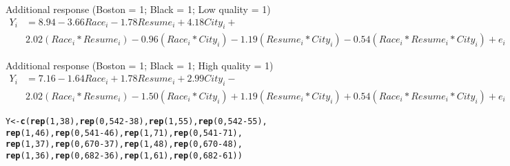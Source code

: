 \documentclass[11pt,notitlepage]{article}\usepackage[]{graphicx}\usepackage[]{color}
\makeatletter
\newcommand{\hlnum}[1]{\textcolor[rgb]{0.686,0.059,0.569}{#1}}%
\newcommand{\hlopt}[1]{\textcolor[rgb]{0,0,0}{#1}}%
\newcommand{\hlstd}[1]{\textcolor[rgb]{0.345,0.345,0.345}{#1}}%
\newcommand{\hlkwb}[1]{\textcolor[rgb]{0.69,0.353,0.396}{#1}}%
\newcommand{\hlkwd}[1]{\textcolor[rgb]{0.737,0.353,0.396}{\textbf{#1}}}%
\newenvironment{kframe}{%
 \def\at@end@of@kframe{}%
 \ifinner\ifhmode%
  \def\at@end@of@kframe{\end{minipage}}%
  \begin{minipage}{\columnwidth}%
 \fi\fi%
 \def\FrameCommand##1{\hskip\@totalleftmargin \hskip-\fboxsep
 \colorbox{shadecolor}{##1}\hskip-\fboxsep
     \hskip-\linewidth \hskip-\@totalleftmargin \hskip\columnwidth}%
 \MakeFramed {\advance\hsize-\width
   \@totalleftmargin\z@ \linewidth\hsize
   \@setminipage}}%
 {\par\unskip\endMakeFramed%
 \at@end@of@kframe}
\makeatother
\begin{document}
\begin{enumerate}[a)]
Additional response (Boston = 1; Black = 1; Low quality = 1)
\begin{align*}
Y_i &= 8.94 - 3.66 Race_i - 1.78 Resume_i + 4.18 City_i + \\
& 2.02 (Race_i * Resume_i) - 0.96  (Race_i * City_i) - 1.19  (Resume_i * City_i) -0.54 (Race_i * Resume_i * City_i) + e_i
\end{align*}

Additional response (Boston = 1; Black = 1; High quality = 1)
\begin{align*}
Y_i &= 7.16 - 1.64 Race_i + 1.78 Resume_i + 2.99 City_i - \\
& 2.02 (Race_i * Resume_i) - 1.50  (Race_i * City_i) + 1.19  (Resume_i * City_i) + 0.54 (Race_i * Resume_i * City_i) + e_i
\end{align*}

\begin{kframe}
\begin{alltt}
\hlstd{Y} \hlkwb{<-} \hlkwd{c}\hlstd{(}\hlkwd{rep}\hlstd{(}\hlnum{1}\hlstd{,} \hlnum{38}\hlstd{),} \hlkwd{rep}\hlstd{(}\hlnum{0}\hlstd{,} \hlnum{542}\hlopt{-}\hlnum{38}\hlstd{),} \hlkwd{rep}\hlstd{(}\hlnum{1}\hlstd{,} \hlnum{55}\hlstd{),} \hlkwd{rep}\hlstd{(}\hlnum{0}\hlstd{,} \hlnum{542}\hlopt{-}\hlnum{55}\hlstd{),}
       \hlkwd{rep}\hlstd{(}\hlnum{1}\hlstd{,} \hlnum{46}\hlstd{),} \hlkwd{rep}\hlstd{(}\hlnum{0}\hlstd{,} \hlnum{541}\hlopt{-}\hlnum{46}\hlstd{),} \hlkwd{rep}\hlstd{(}\hlnum{1}\hlstd{,} \hlnum{71}\hlstd{),} \hlkwd{rep}\hlstd{(}\hlnum{0}\hlstd{,} \hlnum{541}\hlopt{-}\hlnum{71}\hlstd{),}
       \hlkwd{rep}\hlstd{(}\hlnum{1}\hlstd{,} \hlnum{37}\hlstd{),} \hlkwd{rep}\hlstd{(}\hlnum{0}\hlstd{,} \hlnum{670}\hlopt{-}\hlnum{37}\hlstd{),} \hlkwd{rep}\hlstd{(}\hlnum{1}\hlstd{,} \hlnum{48}\hlstd{),} \hlkwd{rep}\hlstd{(}\hlnum{0}\hlstd{,} \hlnum{670}\hlopt{-}\hlnum{48}\hlstd{),}
       \hlkwd{rep}\hlstd{(}\hlnum{1}\hlstd{,} \hlnum{36}\hlstd{),} \hlkwd{rep}\hlstd{(}\hlnum{0}\hlstd{,} \hlnum{682}\hlopt{-}\hlnum{36}\hlstd{),} \hlkwd{rep}\hlstd{(}\hlnum{1}\hlstd{,} \hlnum{61}\hlstd{),} \hlkwd{rep}\hlstd{(}\hlnum{0}\hlstd{,} \hlnum{682}\hlopt{-}\hlnum{61}\hlstd{))}


\end{alltt}
\end{kframe}
\end{enumerate}
\end{document}
